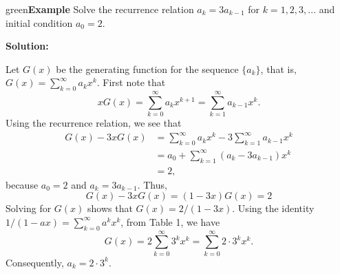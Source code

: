 \documentclass[11pt]{article}
\newenvironment{example}[1][\unskip]{\begin{mybox}{green}{\textbf{Example} {#1}}}{\end{mybox}}
\begin{document}
\begin{example}
Solve the recurrence relation $a_k = 3a_{k-1}$ for $k = 1, 2, 3, ...$ and initial condition $a_0 = 2$.

\textbf{Solution:}

Let $G(x)$ be the generating function for the sequence $\{a_k\}$, that is, $G(x) = \sum_{k=0}^{\infty} a_kx^k$. First note that
\begin{equation*}
    x G(x) = \sum_{k=0}^{\infty} a_kx^{k+1} = \sum_{k=1}^{\infty} a_{k-1}x^k.
\end{equation*}
Using the recurrence relation, we see that
\begin{align*}
    G(x) - 3x G(x) &= \sum_{k=0}^{\infty} a_kx^k - 3 \sum_{k=1}^{\infty} a_{k-1}x^k\\
    &= a_0 + \sum_{k=1}^{\infty} (a_k - 3 a_{k-1})x^k\\
    &= 2,
\end{align*}
because $a_0 = 2$ and $a_k = 3a_{k-1}$. Thus,
\begin{equation*}
    G(x) - 3xG(x) = (1-3x)G(x) = 2
\end{equation*}
Solving for $G(x)$ shows that $G(x) = 2/(1-3x)$. Using the identity $1/(1-ax) = \sum_{k=0}^{\infty} a^kx^k$, from Table 1, we have
\begin{equation*}
    G(x) = 2 \sum_{k=0}^{\infty} 3^kx^k = \sum_{k=0}^{\infty} 2 \cdot 3^kx^k.
\end{equation*}
Consequently, $a_k = 2 \cdot 3^k$.
\end{example}
\end{document}
